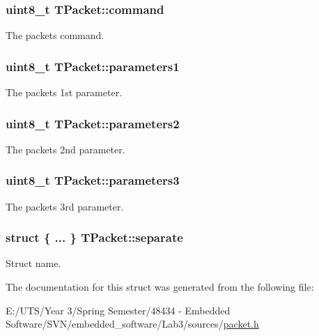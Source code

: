 \subsubsection[{command}]{\setlength{\rightskip}{0pt plus 5cm}uint8\+\_\+t T\+Packet\+::command}\label{struct_t_packet_a5cec09aa383544e7b1413e08205d09ea}
The packet\textquotesingle{}s command. \hypertarget{struct_t_packet_a520692e561b74732ec56a316f26ee04a}{}
\subsubsection[{parameters1}]{\setlength{\rightskip}{0pt plus 5cm}uint8\+\_\+t T\+Packet\+::parameters1}\label{struct_t_packet_a520692e561b74732ec56a316f26ee04a}
The packet\textquotesingle{}s 1st parameter. \hypertarget{struct_t_packet_a618c0f45bfab42f767d2cc716059ae69}{}
\subsubsection[{parameters2}]{\setlength{\rightskip}{0pt plus 5cm}uint8\+\_\+t T\+Packet\+::parameters2}\label{struct_t_packet_a618c0f45bfab42f767d2cc716059ae69}
The packet\textquotesingle{}s 2nd parameter. \hypertarget{struct_t_packet_a202cb1f3110b6077bfe1c3dd23a6af62}{}
\subsubsection[{parameters3}]{\setlength{\rightskip}{0pt plus 5cm}uint8\+\_\+t T\+Packet\+::parameters3}\label{struct_t_packet_a202cb1f3110b6077bfe1c3dd23a6af62}
The packet\textquotesingle{}s 3rd parameter. \hypertarget{struct_t_packet_ac006ca77d7e0c5226e0ae2500c28308b}{}
\subsubsection[{separate}]{\setlength{\rightskip}{0pt plus 5cm}struct \{ ... \}   T\+Packet\+::separate}\label{struct_t_packet_ac006ca77d7e0c5226e0ae2500c28308b}
Struct name. 

The documentation for this struct was generated from the following file\+:\begin{DoxyCompactItemize}
\item 
E\+:/\+U\+T\+S/\+Year 3/\+Spring Semester/48434 -\/ Embedded Software/\+S\+V\+N/embedded\+\_\+software/\+Lab3/sources/\hyperlink{packet_8h}{packet.\+h}\end{DoxyCompactItemize}
